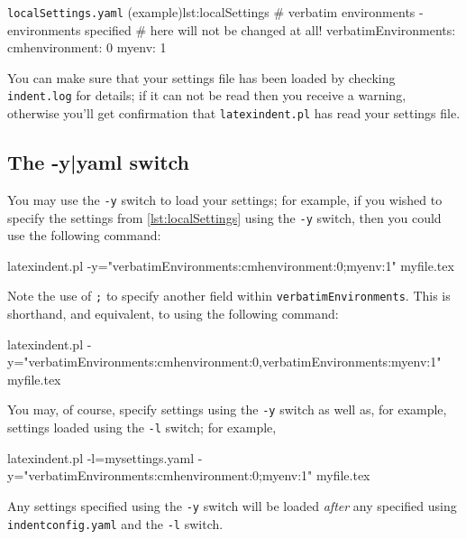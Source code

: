  \begin{yaml}{\texttt{localSettings.yaml} (example)}{lst:localSettings}
#  verbatim environments - environments specified
#  here will not be changed at all!
verbatimEnvironments:
    cmhenvironment: 0
    myenv: 1
\end{yaml}

 You can make sure that your settings file has been loaded by checking
 \texttt{indent.log} for details; if it can not be read then you receive a warning,
 otherwise you'll get confirmation that \texttt{latexindent.pl} has read your settings
 file.

\subsection{The -y|yaml switch}\label{sec:yamlswitch}
 You%
 may use the \texttt{-y} switch to load your settings;  for example, if you wished to
 specify the settings from \cref{lst:localSettings} using the \texttt{-y} switch, then you
 could use the following command:

 \begin{commandshell}
latexindent.pl -y="verbatimEnvironments:cmhenvironment:0;myenv:1" myfile.tex
\end{commandshell}

 Note the use of \texttt{;} to specify another field within
 \texttt{verbatimEnvironments}. This is shorthand, and equivalent, to using the following
 command: 

 \begin{commandshell}
latexindent.pl -y="verbatimEnvironments:cmhenvironment:0,verbatimEnvironments:myenv:1" myfile.tex
\end{commandshell}

 You may, of course, specify settings using the \texttt{-y} switch as well as, for
 example, settings loaded using the \texttt{-l} switch; for example,  

 \begin{commandshell}
latexindent.pl -l=mysettings.yaml -y="verbatimEnvironments:cmhenvironment:0;myenv:1" myfile.tex
\end{commandshell}

 Any settings specified using the \texttt{-y} switch will be loaded \emph{after} any
 specified using \texttt{indentconfig.yaml} and the \texttt{-l} switch.

